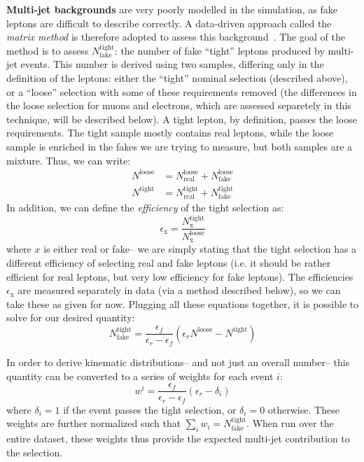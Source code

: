 \textbf{Multi-jet backgrounds} are very poorly modelled in the simulation, as fake leptons are difficult to describe correctly. A data-driven approach called the \textit{matrix method} is therefore adopted to assess this background~\cite{MatrixMethod}. The goal of the method is to assess $N_\mathrm{fake}^\mathrm{tight}$: the number of fake ``tight'' leptons produced by multi-jet events.  This number is derived using two samples, differing only in the definition of the leptons: either the ``tight'' nominal selection (described above), or a ``loose'' selection with some of these requirements removed (the differences in the loose selection for muons and electrons, which are assessed separetely in this technique, will be described below). A tight lepton, by definition, passes the loose requirements. The tight sample mostly contains real leptons, while the loose sample is enriched in the fakes we are trying to measure, but both samples are a mixture. Thus, we can write:
%
\begin{align}
N^\mathrm{loose} &= N_\mathrm{real}^\mathrm{loose} + N_\mathrm{fake}^\mathrm{loose}\\
N^\mathrm{tight} &= N_\mathrm{real}^\mathrm{tight} + N_\mathrm{fake}^\mathrm{tight}
\end{align}
%
In addition, we can define the \textit{efficiency} of the tight selection as:
%
\begin{equation}
\epsilon_\mathrm{x} = \frac{N^\mathrm{tight}_\mathrm{x}}{N^\mathrm{loose}_\mathrm{x}}
\end{equation}
%
where $x$ is either real or fake-- we are simply stating that the tight selection has a different efficiency of selecting real and fake leptons (i.e. it should be rather efficient for real leptons, but very low efficiency for fake leptons). The efficiencies $\epsilon_\mathrm{x}$ are measured separately in data (via a method described below), so we can take these as given for now. Plugging all these equations together, it is possible to solve for our desired quantity:
%
\begin{equation}
N_\mathrm{fake}^\mathrm{tight} = \frac{\epsilon_f}{\epsilon_r - \epsilon_f} \left(\epsilon_r N^\mathrm{loose} - N^\mathrm{tight} \right)
\end{equation}

In order to derive kinematic distributions-- and not just an overall number-- this quantity can be converted to a series of weights for each event $i$:
%
\begin{equation}
w^i = \frac{\epsilon_f}{\epsilon_r - \epsilon_f} (\epsilon_r - \delta_i)
\end{equation}
%
where $\delta_i = 1$ if the event passes the tight selection, or $\delta_i = 0$ otherwise. These weights are further normalized such that $\sum_i w_i = N_\mathrm{fake}^\mathrm{tight}$. When run over the entire dataset, these weights thus provide the expected multi-jet contribution to the selection.

